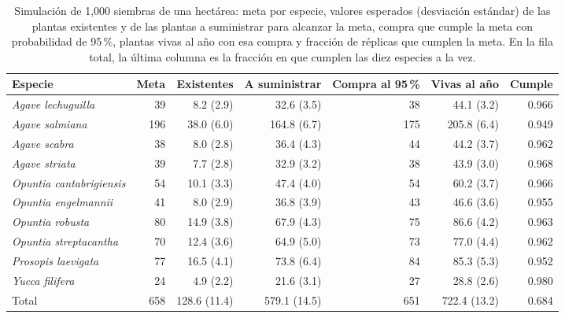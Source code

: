 \begin{table}[t]
\centering
\caption{Simulación de 1{,}000 siembras de una hectárea: meta por especie, valores esperados (desviación estándar) de las plantas existentes y de las plantas a suministrar para alcanzar la meta, compra que cumple la meta con probabilidad de 95\,\%, plantas vivas al año con esa compra y fracción de réplicas que cumplen la meta. En la fila total, la última columna es la fracción en que cumplen las diez especies a la vez.}
\label{tab:siembra}
\small
\begin{tabular}{@{}lrrrrrr@{}}
\toprule
Especie & Meta & Existentes & A suministrar & Compra al 95\,\% & Vivas al año & Cumple \\
\midrule
\textit{Agave lechuguilla}       &  39 &   8.2 (2.9) &  32.6 (3.5) &  38 &  44.1 (3.2) & 0.966 \\
\textit{Agave salmiana}          & 196 &  38.0 (6.0) & 164.8 (6.7) & 175 & 205.8 (6.4) & 0.949 \\
\textit{Agave scabra}            &  38 &   8.0 (2.8) &  36.4 (4.3) &  44 &  44.2 (3.7) & 0.962 \\
\textit{Agave striata}           &  39 &   7.7 (2.8) &  32.9 (3.2) &  38 &  43.9 (3.0) & 0.968 \\
\textit{Opuntia cantabrigiensis} &  54 &  10.1 (3.3) &  47.4 (4.0) &  54 &  60.2 (3.7) & 0.966 \\
\textit{Opuntia engelmannii}     &  41 &   8.0 (2.9) &  36.8 (3.9) &  43 &  46.6 (3.6) & 0.955 \\
\textit{Opuntia robusta}         &  80 &  14.9 (3.8) &  67.9 (4.3) &  75 &  86.6 (4.2) & 0.963 \\
\textit{Opuntia streptacantha}   &  70 &  12.4 (3.6) &  64.9 (5.0) &  73 &  77.0 (4.4) & 0.962 \\
\textit{Prosopis laevigata}      &  77 &  16.5 (4.1) &  73.8 (6.4) &  84 &  85.3 (5.3) & 0.952 \\
\textit{Yucca filifera}          &  24 &   4.9 (2.2) &  21.6 (3.1) &  27 &  28.8 (2.6) & 0.980 \\
\midrule
Total                            & 658 & 128.6 (11.4) & 579.1 (14.5) & 651 & 722.4 (13.2) & 0.684 \\
\bottomrule
\end{tabular}
\end{table}

